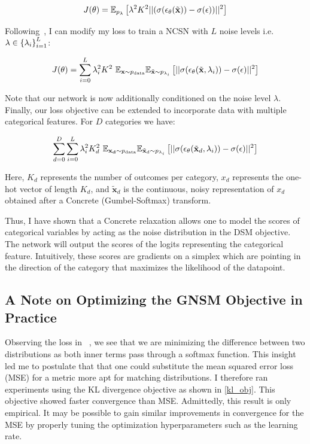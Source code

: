 \begin{equation}
\label{eq:train_obj}
    J(\theta)  = \mathbb{E}_{p_{\lambda}} \left[ { \lambda^2 K^2 ||( \sigma( \epsilon_\theta(\Tilde{\mathbf{x}}) ) - \sigma(\epsilon) )||^2 } \right]
\end{equation}

Following~\cite{Song2019}, I can modify my loss to train a NCSN with $L$ noise levels i.e. $\lambda \in \left\{ {\lambda_i} \right\}_{i=1}^L$:

\begin{equation*}
    J(\theta)  = \sum_{i=0}^{L} \lambda_i^2 K^2 ~\mathbb{E}_{\mathbf{x} \sim p_{\text{data}}} \mathbb{E}_{\Tilde{\mathbf{x}} \sim p_{\lambda_i}} \left[ { || \sigma( \epsilon_\theta(\Tilde{\mathbf{x}}, \lambda_i) ) - \sigma(\epsilon) ||^2 } \right]
\end{equation*}

Note that our network is now additionally conditioned on the noise level $\lambda$. Finally, our loss objective can be extended to incorporate data with multiple categorical features. For $D$ categories we have:

\begin{equation}
\label{eq:ncsn_obj}
    \sum_{d=0}^{D} \sum_{i=0}^{L} \lambda_i^2 K_d^2 ~\mathbb{E}_{\mathbf{x_d} \sim p_{\text{data}}} \mathbb{E}_{\Tilde{\mathbf{x}}_d \sim p_{\lambda_i}} \left[ { || \sigma( \epsilon_\theta(\tilde{\mathbf{x}}_d,  \lambda_i) ) - \sigma(\epsilon)||^2 } \right]
\end{equation}

Here, $K_d$ represents the number of outcomes per category, $x_d$ represents the one-hot vector of length $K_d$, and  $\tilde{\mathbf{x}}_d$ is the continuous, noisy representation of $x_d$ obtained after a Concrete (Gumbel-Softmax) transform.

Thus, I have shown that a Concrete relaxation allows one to model the scores of categorical variables by acting as the noise distribution in the DSM objective. The network will output the scores of the logits representing the categorical feature. Intuitively, these scores are gradients on a simplex which are pointing in the direction of the category that maximizes the likelihood of the datapoint.

\subsection*{A Note on Optimizing the GNSM Objective in Practice}

Observing the loss in ~, we see that we are minimizing the difference between two distributions as both inner terms pass through a softmax function. This insight led me to postulate that that one could substitute the mean squared error loss (MSE) for a metric more apt for matching distributions. I therefore ran experiments using the KL divergence objective as shown in \eqref{kl_obj}. This objective showed faster convergence than MSE. Admittedly, this result is only empirical. It may be possible to gain similar improvements in convergence for the MSE by properly tuning the optimization hyperparameters such as the learning rate.

